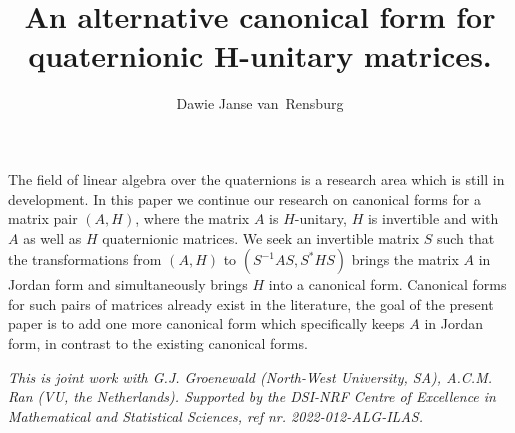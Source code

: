 \documentclass[a4paper]{amsart}
\date{}
\begin{document}
\title{An alternative canonical form for quaternionic H-unitary matrices.}
\author{Dawie Janse van~Rensburg} %
\address{North-West University, Potchefstroom, South Africa.} %

\maketitle


The field of linear algebra over the quaternions is a research area which is still in development. In this paper we continue our research on canonical forms for a matrix pair $(A, H)$, where the matrix $A$ is $H$-unitary, $H$ is invertible and with $A$ as well as $H$ quaternionic matrices. We seek an invertible matrix $S$ such that the transformations from $(A, H)$ to 
$(S^{-1}AS, S^*HS)$
brings the matrix $A$ in Jordan form and simultaneously brings $H$ into a canonical form. Canonical forms for such pairs of matrices already exist in the literature, the goal of the present paper is to add one more canonical form which specifically keeps $A$ in Jordan form, in contrast to the existing canonical forms.

\emph{This is joint work with G.J. Groenewald (North-West University, SA), A.C.M. Ran (VU, the Netherlands).
Supported by the DSI-NRF Centre of Excellence in Mathematical and Statistical Sciences, ref nr. 2022-012-ALG-ILAS.}


\end{document}
